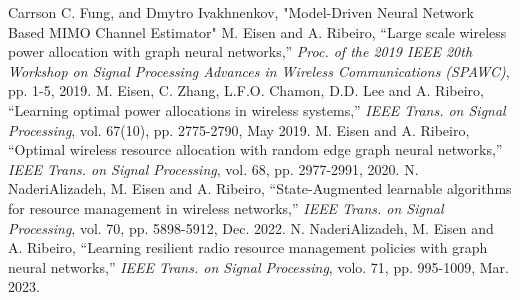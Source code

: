 \documentclass[a4paper, onecolumn, , 11pt]{IEEEtran}
\begin{document}
    \begin{thebibliography}{1}
        Carrson C. Fung, and Dmytro Ivakhnenkov, "Model-Driven Neural Network Based MIMO Channel Estimator"
        M. Eisen and A. Ribeiro, ``Large scale wireless power allocation with graph neural networks,'' \emph{Proc. of the 2019 IEEE 20th Workshop on Signal Processing Advances in Wireless Communications (SPAWC)}, pp. 1-5, 2019.
        M. Eisen, C. Zhang, L.F.O. Chamon, D.D. Lee and A. Ribeiro, ``Learning optimal power allocations in wireless systems,'' \emph{IEEE Trans. on Signal Processing}, vol. 67(10), pp. 2775-2790, May 2019.
        M. Eisen and A. Ribeiro, ``Optimal wireless resource allocation with random edge graph neural networks,'' \emph{IEEE Trans. on Signal Processing}, vol. 68, pp. 2977-2991, 2020.
        N. NaderiAlizadeh, M. Eisen and A. Ribeiro, ``State-Augmented learnable algorithms for resource management in wireless networks,'' \emph{IEEE Trans. on Signal Processing}, vol. 70, pp. 5898-5912, Dec. 2022.
        N. NaderiAlizadeh, M. Eisen and A. Ribeiro, ``Learning resilient radio resource management policies with graph neural networks,'' \emph{IEEE Trans. on Signal Processing}, volo. 71, pp. 995-1009, Mar. 2023.
    \end{thebibliography}
\end{document}
